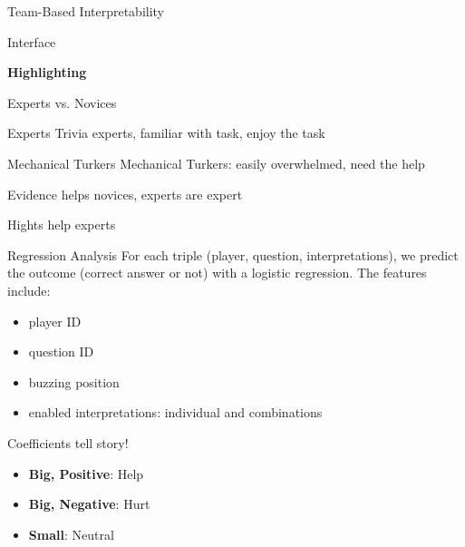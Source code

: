 \documentclass[xcolor=dvipsnames]{beamer}
\newcommand{\fsi}[2]{
\begin{frame}[plain]
\vspace*{-1pt}
\makebox[\linewidth]{\texttt{[image: \#1]}}
\begin{center}
#2
\end{center}
\end{frame}
}
\newcommand{\gfxq}[2]{
\begin{center}
	\texttt{[image: qb/\#1]}
\end{center}
}
\begin{document}
\begin{frame}{Team-Based Interpretability}

  \only<1>{\gfxq{qb_centaur_1}{.9}}
  \only<2>{\gfxq{qb_centaur_2}{.9}}
  \only<3>{\gfxq{qb_centaur_3}{.9}}
  \only<4>{\gfxq{qb_centaur_6}{.9}}

\end{frame}


\fsi{qb/augment/screenshot_all}{Interface}

\fsi{qb/augment/screenshot_guesses}{}

\fsi{qb/augment/screenshot_highlight}{{\bf Highlighting}}

\fsi{qb/augment/screenshot_evidence}{}

\begin{frame}{Experts vs. Novices}

 \begin{block}{Experts}
   Trivia experts, familiar with task, enjoy the task
 \end{block}

 \begin{block}{Mechanical Turkers}
   Mechanical Turkers: easily overwhelmed, need the help
 \end{block}

\end{frame}

\fsi{qb/augment/tools_acc}{Evidence helps novices, experts are expert}
\fsi{qb/augment/tools_buzz}{Hights help experts}

\begin{frame}{Regression Analysis}
    For each triple (player, question, interpretations), we predict the outcome
    (correct answer or not) with a logistic regression. The features include:
    \begin{itemize}
        \item player ID
        \item question ID
        \item buzzing position
        \item enabled interpretations: individual and combinations
    \end{itemize}

    \pause

    \begin{block}{Coefficients tell story!}
      \begin{itemize}
        \item {\bf Big, Positive}: Help
        \item {\bf Big, Negative}: Hurt
        \item {\bf Small}: Neutral
      \end{itemize}
    \end{block}

\end{frame}
\end{document}
